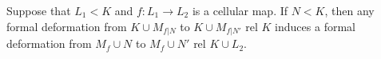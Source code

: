 Suppose that $L_1 < K$ and $f: L_1 \rightarrow L_2$ is a cellular map. If $N < K$, then any formal deformation from $K \cup M_{f|N}$ to $K \cup M_{f|N'}$ rel $K$ induces a formal deformation from $M_f \cup N$ to $M_f \cup N'$ rel $K \cup L_2$.
